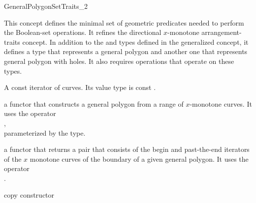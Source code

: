 \ccRefPageBegin

\begin{ccRefConcept}{GeneralPolygonSetTraits_2}

\ccThreeToTwo

\ccDefinition
This concept defines the minimal set of geometric predicates needed to
perform the Boolean-set operations. It refines the directional $x$-monotone
arrangement-traits concept. In addition to the  and
 types defined in the generalized concept, it defines
a type that represents a general polygon and another one that represents
general polygon with holes. It also requires operations that operate on these
types.

\ccRefines
{}

\ccTypes

\ccGlue
{}

{A const iterator of curves. Its value type is const
.}


\ccThreeToTwo

{a functor that constructs a general polygon from a range of
$x$-monotone curves. It uses the operator\\
 , \\
 parameterized by the  type.}

{a functor that returns a pair that consists of the begin and
 past-the-end iterators of the $x$ monotone curves of the boundary of
 a given general polygon. It uses the operator\\
 .}

\ccCreation
{}

\ccGlue
{}
{copy constructor}
\ccGlue
{}



\end{ccRefConcept}
